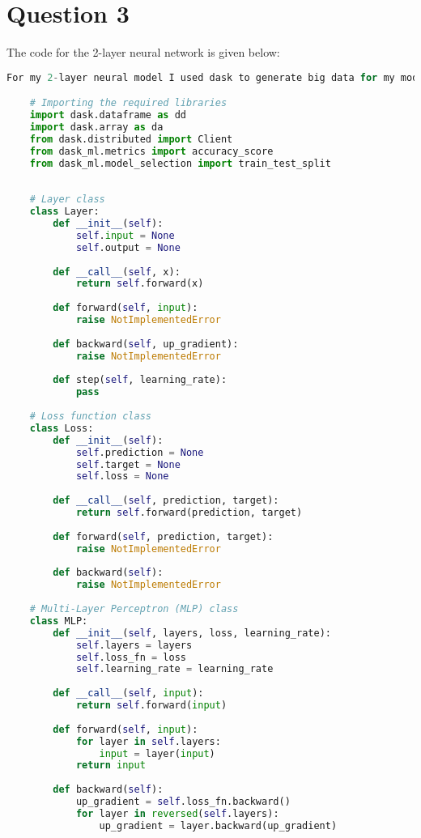 \documentclass[12pt,letterpaper]{article}
\begin{document}
\section*{Question 3}
The code for the 2-layer neural network is given below:
\begin{lstlisting}[language=Python, frame=single, breaklines=true]
    For my 2-layer neural model I used dask to generate big data for my model simulation, instead of using numpy to generate values.

    # Importing the required libraries
    import dask.dataframe as dd
    import dask.array as da
    from dask.distributed import Client
    from dask_ml.metrics import accuracy_score
    from dask_ml.model_selection import train_test_split
 
    
    # Layer class
    class Layer:
        def __init__(self):
            self.input = None
            self.output = None
    
        def __call__(self, x):
            return self.forward(x)
    
        def forward(self, input):
            raise NotImplementedError
    
        def backward(self, up_gradient):
            raise NotImplementedError
    
        def step(self, learning_rate):
            pass
    
    # Loss function class
    class Loss:
        def __init__(self):
            self.prediction = None
            self.target = None
            self.loss = None
    
        def __call__(self, prediction, target):
            return self.forward(prediction, target)
    
        def forward(self, prediction, target):
            raise NotImplementedError
    
        def backward(self):
            raise NotImplementedError
    
    # Multi-Layer Perceptron (MLP) class
    class MLP:
        def __init__(self, layers, loss, learning_rate):
            self.layers = layers
            self.loss_fn = loss
            self.learning_rate = learning_rate
    
        def __call__(self, input):
            return self.forward(input)
    
        def forward(self, input):
            for layer in self.layers:
                input = layer(input)
            return input
    
        def backward(self):
            up_gradient = self.loss_fn.backward()
            for layer in reversed(self.layers):
                up_gradient = layer.backward(up_gradient)
    

\end{lstlisting}
\end{document}
